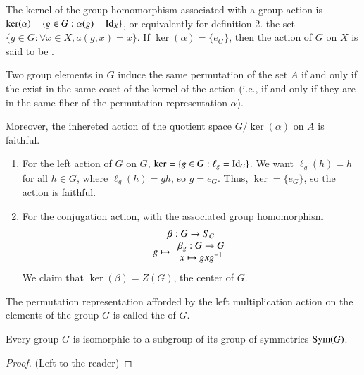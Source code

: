 \begin{defn}
        The kernel of the group homomorphism associated with a group action is $\ker(\alpha) = \{g \in G:\alpha(g) = \operatorname{Id}_X\}$, or equivalently for definition 2. the set $\{g \in G: \forall x \in X, a(g,x) = x\}$. If $\ker(\alpha) = \{e_G\}$, then the action of $G$ on $X$ is said to be .
\end{defn}

\begin{rmk}
    Two group elements in $G$ induce the same permutation of the set $A$ if and only if the exist in the same coset of the kernel of the action (i.e., if and only if they are in the same fiber of the permutation representation $\alpha$).


    Moreover, the inhereted action of the quotient space $G/\ker(\alpha)$ on $A$ is faithful.
\end{rmk}


\begin{eg}
        \leavevmode
        \begin{enumerate}
                \item For the left action of $G$ on $G$, $\ker = \{g \in G: \ell_g = \operatorname{Id}_G\}$. We want $\ell_g(h) = h$ for all $h \in G$, where $\ell_g(h) = gh$, so $g = e_G$. Thus, $\ker = \{e_G\}$, so the action is faithful.
                \item For the conjugation action, with the associated group homomorphism \begin{equation}
                                \begin{array}{c} \beta:G\rightarrow S_G \\ g\mapsto\begin{array}{c} \beta_g:G\rightarrow G \\ x\mapsto gxg^{-1} \end{array} \end{array}
                        \end{equation}
                        We claim that $\ker(\beta) = Z(G)$, the center of $G$.
        \end{enumerate}
\end{eg}


\begin{defn}
    The permutation representation afforded by the left multiplication action on the elements of the group $G$ is called the  of $G$.
\end{defn}

\begin{namthm}
        Every group $G$ is isomorphic to a subgroup of its group of symmetries $\operatorname{Sym}(G)$.
\end{namthm}
\begin{proof}
        (Left to the reader)
\end{proof}


